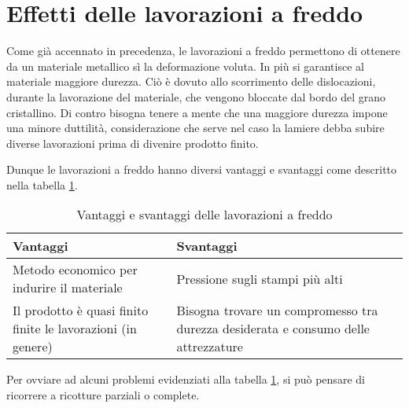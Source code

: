 \section{Effetti delle lavorazioni a freddo}
Come già accennato in precedenza, le lavorazioni a freddo permettono di ottenere da un materiale metallico sì la deformazione voluta. In più si garantisce al materiale maggiore durezza.
Ciò è dovuto allo scorrimento delle dislocazioni, durante la lavorazione del materiale, che vengono bloccate dal bordo del grano cristallino.
Di contro bisogna tenere a mente che una maggiore durezza impone una minore duttilità, considerazione che serve nel caso la lamiere debba subire diverse lavorazioni prima di divenire prodotto finito.

Dunque le lavorazioni a freddo hanno diversi vantaggi e svantaggi come descritto nella tabella \ref{tab:VantSvantFreddo}.

\begin{table}
\centering
\caption{Vantaggi e svantaggi delle lavorazioni a freddo}
\label{tab:VantSvantFreddo}
\begin{tabularx}{\textwidth}{XX}
\toprule
\textcolor{UnifeDark}{\textbf{Vantaggi}} & \textcolor{UnifeDark}{\textbf{Svantaggi}}\\
\midrule
Metodo economico per indurire il materiale &
Pressione sugli stampi più alti\\
Il prodotto è quasi finito finite le lavorazioni (in genere) &
Bisogna trovare un compromesso tra durezza desiderata e consumo delle attrezzature\\
\bottomrule
\end{tabularx}
\end{table}

Per ovviare ad alcuni problemi evidenziati alla tabella \ref{tab:VantSvantFreddo}, si può pensare di ricorrere a ricotture parziali o complete.

